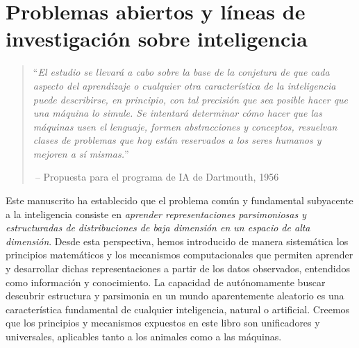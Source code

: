 \documentclass[../../book-main_es.tex]{subfiles}
\begin{document}
\chapter{Problemas abiertos y líneas de investigación sobre inteligencia}
\label{ch:future}

\begin{quote}
    ``\textit{El estudio se llevará a cabo sobre la base de la conjetura de 
        que cada aspecto del aprendizaje o cualquier otra característica de la 
        inteligencia puede describirse, en principio, con tal precisión que sea 
        posible hacer que una máquina lo simule. Se intentará determinar cómo hacer 
        que las máquinas usen el lenguaje, formen abstracciones y conceptos, resuelvan 
        clases de problemas que hoy están reservados a los seres humanos 
    y mejoren a sí mismas.}''

    $~$\hfill -- Propuesta para el programa de IA de Dartmouth, 1956
\end{quote}
\vspace{5mm}

Este manuscrito ha establecido que el problema común y fundamental subyacente a la inteligencia consiste
en {\em aprender representaciones parsimoniosas y estructuradas de distribuciones de baja dimensión
en un espacio de alta dimensión}. Desde esta perspectiva, hemos introducido de manera sistemática los principios matemáticos y los mecanismos
computacionales que permiten aprender y desarrollar dichas representaciones a partir de los datos observados, entendidos como información y conocimiento. 
La capacidad de autónomamente buscar descubrir estructura y parsimonia en un mundo
aparentemente aleatorio es una característica fundamental de cualquier inteligencia, natural o artificial.
Creemos que los principios y mecanismos expuestos en este libro son unificadores y universales, 
aplicables tanto a los animales como a las máquinas.
\end{document}
